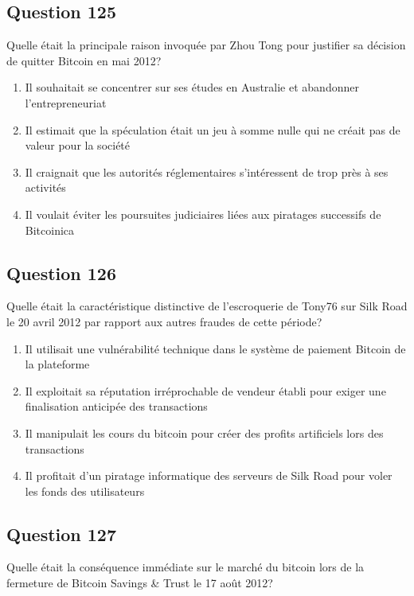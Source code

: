 \documentclass[12pt,a4paper]{article}
\begin{document}
\bigskip


\subsection*{Question 125}
Quelle était la principale raison invoquée par Zhou Tong pour justifier sa décision de quitter Bitcoin en mai 2012?

\begin{enumerate}[label=\Alph*., leftmargin=*]
\item Il souhaitait se concentrer sur ses études en Australie et abandonner l'entrepreneuriat
\item Il estimait que la spéculation était un jeu à somme nulle qui ne créait pas de valeur pour la société
\item Il craignait que les autorités réglementaires s'intéressent de trop près à ses activités
\item Il voulait éviter les poursuites judiciaires liées aux piratages successifs de Bitcoinica
\end{enumerate}

\bigskip


\subsection*{Question 126}
Quelle était la caractéristique distinctive de l'escroquerie de Tony76 sur Silk Road le 20 avril 2012 par rapport aux autres fraudes de cette période?

\begin{enumerate}[label=\Alph*., leftmargin=*]
\item Il utilisait une vulnérabilité technique dans le système de paiement Bitcoin de la plateforme
\item Il exploitait sa réputation irréprochable de vendeur établi pour exiger une finalisation anticipée des transactions
\item Il manipulait les cours du bitcoin pour créer des profits artificiels lors des transactions
\item Il profitait d'un piratage informatique des serveurs de Silk Road pour voler les fonds des utilisateurs
\end{enumerate}

\bigskip


\subsection*{Question 127}
Quelle était la conséquence immédiate sur le marché du bitcoin lors de la fermeture de Bitcoin Savings & Trust le 17 août 2012?
\end{document}
